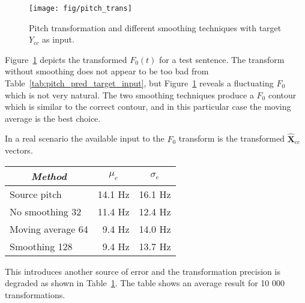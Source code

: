 \begin{figure}[htbp]
	\begin{center}
		\texttt{[image: fig/pitch\_trans]}
		\caption{Pitch transformation and different smoothing techniques with target $Y_{cc}$ as input.}
		\label{fig:pitch_trans}
	\end{center}
\end{figure}
Figure~\ref{fig:pitch_trans} depicts the transformed $F_0(t)$ for a test sentence. The transform without smoothing does not appear to be too bad from Table~\ref{tab:pitch_pred_target_input}, but Figure~\ref{fig:pitch_trans} reveals a fluctuating $F_0$ which is not very natural. The two smoothing techniques produce a $F_0$ contour which is similar to the correct contour, and in this particular case the moving average is the best choice. 

In a real scenario the available input to the $F_0$ transform is the transformed $\mathbf{\hat{X}}_{cc}$ vectors. 
\begin{table}[htbp]
	\begin{center}
		\label{tab:pitch_pred_transformed_input}	
		\begin{tabular}{lrr}
			\toprule
			\multicolumn{1}{c}{\emph{Method}} & \multicolumn{1}{c}{$\mu_e$} & \multicolumn{1}{c}{$\sigma_e$}\\
			\midrule
			Source pitch & 14.1 Hz & 16.1 Hz\\
			No smoothing 32 & 11.4 Hz  & 12.4 Hz\\
			Moving average 64 & 9.4 Hz  & 14.0 Hz\\
			Smoothing 128 & 9.4 Hz & 13.7 Hz\\
			\bottomrule			
		\end{tabular}		
	\end{center}
\end{table}
This introduces another source of error and the transformation precision is degraded as shown in Table~\ref{tab:pitch_pred_transformed_input}. The table shows an average result for 10 000 transformations.

